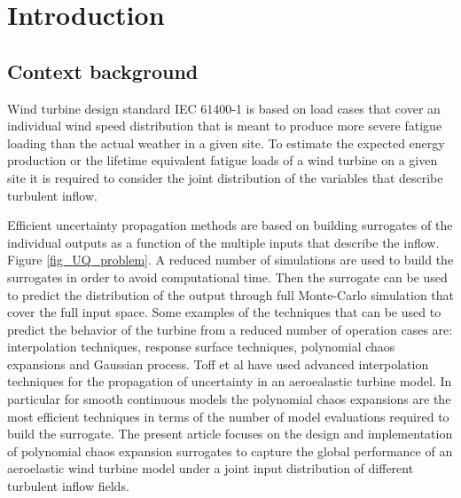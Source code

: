 \documentclass[preprint,12pt]{elsarticle}
\begin{document}

\section{Introduction}
\label{sec_Introduction}

\subsection{Context background}


Wind turbine design standard IEC 61400-1 \cite{international2005iec} is based on load cases that cover an individual wind speed distribution that is meant to produce more severe fatigue loading than the actual weather in a given site. To estimate the expected energy production or the lifetime equivalent fatigue loads of a wind turbine on a given site it is required to consider the joint distribution of the variables that describe turbulent inflow.

Efficient uncertainty propagation methods are based on building surrogates of the individual outputs as a function of the multiple inputs that describe the inflow. Figure \ref{fig_UQ_problem}. A reduced number of simulations are used to build the surrogates in order to avoid computational time. Then the surrogate can be used to predict the distribution of the output through full Monte-Carlo simulation that cover the full input space. Some examples of the techniques that can be used to predict the behavior of the turbine from a reduced number of operation cases are: interpolation techniques, response surface techniques, polynomial chaos expansions and Gaussian process. Toff et al \cite{toft2016assessment} have used advanced interpolation techniques for the propagation of uncertainty in an aeroealastic turbine model. In particular for smooth continuous models the polynomial chaos expansions are the most efficient techniques in terms of the number of model evaluations required to build the surrogate. The present article focuses on the design and implementation of polynomial chaos expansion surrogates to capture the global performance of an aeroelastic wind turbine model under a joint input distribution of different turbulent inflow fields.
\end{document}
